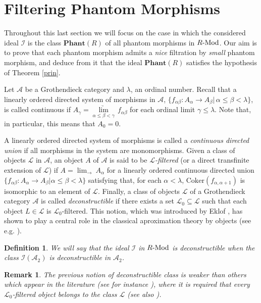 \documentclass[11pt]{amsart}
\newtheorem{defi}[teor]{Definition}
\newtheorem{rem}[teor]{Remark}
\begin{document}
{\section{Filtering Phantom Morphisms}
Throughout this last section we will focus on the case in which the considered ideal $\mathcal I$ is the class ${\mathbf{Phant}(R)}$ of all phantom morphisms in $R{\textrm{-}{\rm Mod}}$. Our aim is to prove that each phantom morphism admits a {\em nice} filtration by {\em small} phantom morphism, and deduce from it that the ideal ${\mathbf{Phant}(R)}$ satisfies the hypothesis of Theorem \ref{prin}.

Let ${\mathcal A}$ be a
Grothendieck category and $\lambda$, an ordinal number. Recall that a linearly ordered directed system of morphisms in $\mathcal A$, $\{f_{\alpha\beta}:A_\alpha\rightarrow A_\beta|\,\alpha\leq\beta<\lambda\}$, is called continuous if $A_\gamma=\underset{\alpha\leq\beta<\gamma}{\underrightarrow{\lim}}\, f_{\alpha\beta}$ for each ordinal limit $\gamma\leq\lambda$. Note that, in particular, this means that $A_0=0$. 

A linearly ordered directed system of morphisms is called a {\em continuous directed union} if all morphisms in the system are monomorphisms.
Given a class of objects $\mathcal L$ in $\mathcal A$, an
object $A$ of $\mathcal A$ is said to be \emph{$\mathcal L$-filtered} (or a direct transfinite extension of $\mathcal L$) if  $ A =
\displaystyle \lim_{ \rightarrow } \: A_{ \alpha } $ for a
 linearly ordered continuous directed union $ \{f_{\alpha\beta}: A_{ \alpha}\rightarrow A_\beta|\alpha\leq\beta<\lambda\} $  
satisfying that, 
for each $ \alpha<\lambda$, $\mathrm{Coker}(f_{\alpha,\alpha+1})$
is isomorphic to an element of $ {\mathcal L} $.
Finally, a class of objects $\mathcal L$  of a Grothendieck category $\mathcal A$ is called \emph{deconstructible} if there exists a set $\mathcal L_0\subseteq\mathcal L$ such that each object $L\in \mathcal L$ is $\mathcal L_0$-filtered.
This notion, which was introduced by Eklof \cite{Ek}, has  shown to play a central role in the classical aproximation theory by objects (see e.g. \cite{S,Tr}).

\begin{defi}\label{decons}
We will say that the ideal $\mathcal I$ in $R{\textrm{-}{\rm Mod}}$ is deconstructible when the class ${\mathcal I(\mathcal A_2)}$ is deconstructible in $\mathcal A_2$.
\end{defi}

\begin{rem}
The previous notion of deconstructible class is weaker than others which appear in the literature (see for instance \cite[Definition 1.4]{S}), where it is required that {\em every} $\mathcal L_0$-filtered object belongs to the class $\mathcal L$ (see also \cite[Definition 1.5]{Tr}).
\end{rem}

}
\end{document}
